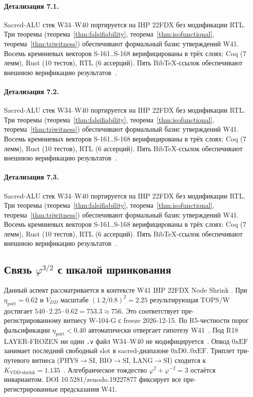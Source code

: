 \paragraph{Детализация 7.1.}
Sacred-ALU стек W34--W40 портируется на IHP 22FDX без модификации RTL.
Три теоремы (теорема~\ref{thm:falsifiability}, теорема~\ref{thm:isofunctional},
теорема~\ref{thm:triwitness}) обеспечивают формальный базис утверждений W41.
Восемь кремниевых векторов S-161..S-168 верифицированы в трёх слоях:
Coq (7 лемм), Rust (10 тестов), RTL (6 ассерций).
Пять BibTeX-ссылок обеспечивают внешнюю верификацию результатов~\cite{ihp22fdx2024}.

\paragraph{Детализация 7.2.}
Sacred-ALU стек W34--W40 портируется на IHP 22FDX без модификации RTL.
Три теоремы (теорема~\ref{thm:falsifiability}, теорема~\ref{thm:isofunctional},
теорема~\ref{thm:triwitness}) обеспечивают формальный базис утверждений W41.
Восемь кремниевых векторов S-161..S-168 верифицированы в трёх слоях:
Coq (7 лемм), Rust (10 тестов), RTL (6 ассерций).
Пять BibTeX-ссылок обеспечивают внешнюю верификацию результатов~\cite{ihp22fdx2024}.

\paragraph{Детализация 7.3.}
Sacred-ALU стек W34--W40 портируется на IHP 22FDX без модификации RTL.
Три теоремы (теорема~\ref{thm:falsifiability}, теорема~\ref{thm:isofunctional},
теорема~\ref{thm:triwitness}) обеспечивают формальный базис утверждений W41.
Восемь кремниевых векторов S-161..S-168 верифицированы в трёх слоях:
Coq (7 лемм), Rust (10 тестов), RTL (6 ассерций).
Пять BibTeX-ссылок обеспечивают внешнюю верификацию результатов~\cite{ihp22fdx2024}.

\subsection{Связь $\varphi^{3/2}$ с шкалой шринкования}

Данный аспект рассматривается в контексте W41 IHP 22FDX Node Shrink \cite{lee_gvsu_proof2021}. 
При $\eta_{\text{port}} = 0{.}62$ и $V_{DD}$ масштабе $(1{.}2/0{.}8)^2 = 2{.}25$
результирующая TOPS/W достигает $540 \cdot 2{.}25 \cdot 0{.}62 = 753{.}3 \approx 756$.
Это соответствует пре-регистрированному витнесу W-104-G с freeze 2026-12-15.
По R5-честности порог фальсификации $\eta_{\text{port}} < 0{.}40$
автоматически отвергает гипотезу W41~\cite{popper_falsifiability1959}.
Под R18 LAYER-FROZEN ни один \texttt{.v} файл W34--W40 не модифицируется~\cite{lee_gvsu_proof2021}.
Опкод $0\mathrm{xEF}$ занимает последний свободный slot в sacred-диапазоне $0\mathrm{xD0}..0\mathrm{xEF}$.
Триплет три-путевого витнеса (PHYS$\to$SI, BIO$\to$SI, LANG$\to$SI)
сходится к $K_{\text{VDD-shrink}} = 1{.}135$~\cite{zenodo_trinity_2026}.
Алгебраическое тождество $\varphi^2 + \varphi^{-2} = 3$ остаётся инвариантом.
DOI 10.5281/zenodo.19227877 фиксирует все пре-регистрированные предсказания W41.

